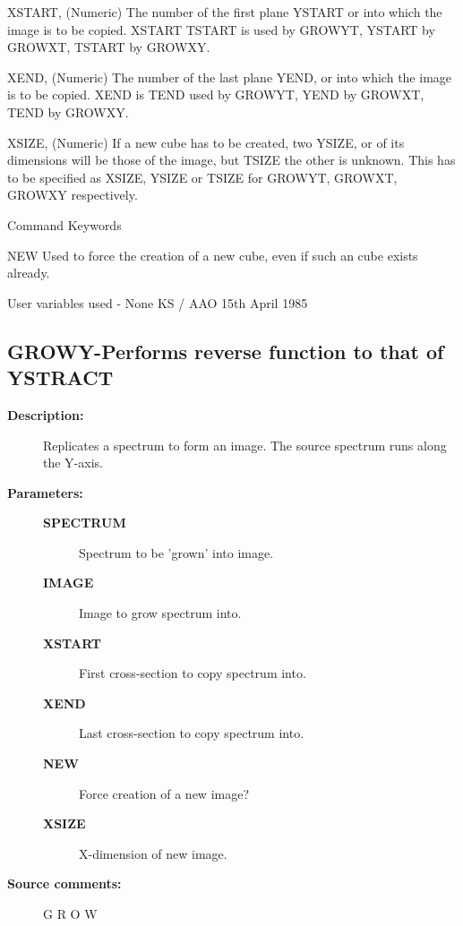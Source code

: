 \begin{description}
\begin{description}
\begin{terminalv}
 XSTART,     (Numeric) The number of the first plane
 YSTART or   into which the image is to be copied.  XSTART
 TSTART      is used by GROWYT, YSTART by GROWXT, TSTART by GROWXY.

 XEND,       (Numeric) The number of the last plane
 YEND, or    into which the image is to be copied.  XEND is
 TEND        used by GROWYT, YEND by GROWXT, TEND by GROWXY.

 XSIZE,      (Numeric) If a new cube has to be created, two
 YSIZE, or   of its dimensions will be those of the image, but
 TSIZE       the other is unknown.  This has to be specified as
             XSIZE, YSIZE or TSIZE for GROWYT, GROWXT, GROWXY
             respectively.

 Command Keywords

 NEW         Used to force the creation of a new cube, even if
             such an cube exists already.

 User variables used -  None
                                         KS / AAO 15th April 1985
\end{terminalv}
\end{description}
\subsection{GROWY-\label{GROWY}Performs reverse function to that of YSTRACT}
\begin{description}

\item [\textbf{Description:}]
 Replicates a spectrum to form an image.  The source spectrum
 runs along the Y-axis.

\item [\textbf{Parameters:}]
\begin{description}
\item [\textbf{SPECTRUM}]
 Spectrum to be 'grown' into image.
\item [\textbf{IMAGE}]
 Image to grow spectrum into.
\item [\textbf{XSTART}]
 First cross-section to copy spectrum into.
\item [\textbf{XEND}]
 Last cross-section to copy spectrum into.
\item [\textbf{NEW}]
 Force creation of a new image?
\item [\textbf{XSIZE}]
 X-dimension of new image.
\end{description}

\item [\textbf{Source comments:}]
\begin{terminalv}
 G R O W


\end{terminalv}
\end{description}
\end{description}
